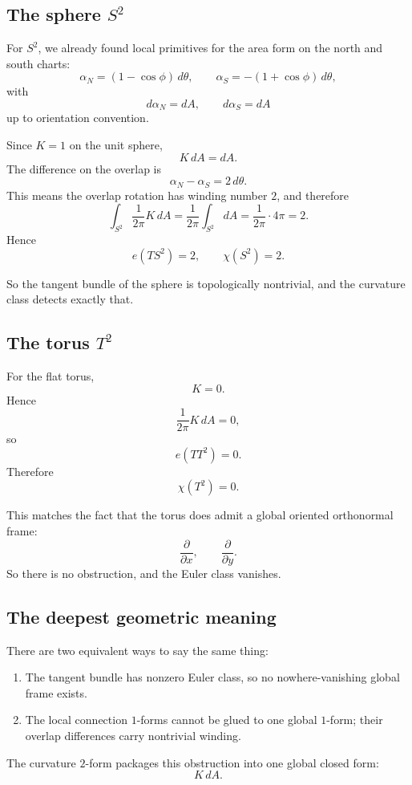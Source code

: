 \documentclass[11pt]{article}
\begin{document}
	\subsection*{The sphere \(S^2\)}
	
	For \(S^2\), we already found local primitives for the area form on the north and south charts:
	\[
	\alpha_N=(1-\cos\phi)\,d\theta,
	\qquad
	\alpha_S=-(1+\cos\phi)\,d\theta,
	\]
	with
	\[
	d\alpha_N=dA,
	\qquad
	d\alpha_S=dA
	\]
	up to orientation convention.
	
	Since \(K=1\) on the unit sphere,
	\[
	K\,dA=dA.
	\]
	The difference on the overlap is
	\[
	\alpha_N-\alpha_S = 2\,d\theta.
	\]
	This means the overlap rotation has winding number \(2\), and therefore
	\[
	\int_{S^2}\frac{1}{2\pi}K\,dA
	=
	\frac{1}{2\pi}\int_{S^2}dA
	=
	\frac{1}{2\pi}\cdot 4\pi
	=
	2.
	\]
	Hence
	\[
	e(TS^2)=2,
	\qquad
	\chi(S^2)=2.
	\]
	
	So the tangent bundle of the sphere is topologically nontrivial, and the curvature class detects exactly that.
	
	\subsection*{The torus \(T^2\)}
	
	For the flat torus,
	\[
	K=0.
	\]
	Hence
	\[
	\frac{1}{2\pi}K\,dA = 0,
	\]
	so
	\[
	e(TT^2)=0.
	\]
	Therefore
	\[
	\chi(T^2)=0.
	\]
	
	This matches the fact that the torus does admit a global oriented orthonormal frame:
	\[
	\frac{\partial}{\partial x},\qquad \frac{\partial}{\partial y}.
	\]
	So there is no obstruction, and the Euler class vanishes.
	
	\subsection*{The deepest geometric meaning}
	
	There are two equivalent ways to say the same thing:
	
	\begin{enumerate}
		\item The tangent bundle has nonzero Euler class, so no nowhere-vanishing global frame exists.
		\item The local connection \(1\)-forms cannot be glued to one global \(1\)-form; their overlap differences carry nontrivial winding.
	\end{enumerate}
	
	The curvature \(2\)-form packages this obstruction into one global closed form:
	\[
	K\,dA.
	\]
	
\end{document}
